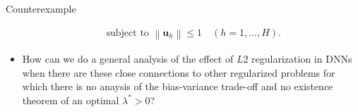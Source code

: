 \documentclass[11pt,compress,t,notes=noshow, xcolor=table]{beamer}
\begin{document}
\begin{vbframe}{Counterexample}
\begin{itemize}
$$\begin{gathered}
\text { subject to }\left\|\boldsymbol{u}_h\right\| \leq 1 \quad(h=1, \ldots, H) .
\end{gathered}
$$
\item How can we do a general analysis of the effect of $L2$ regularization in DNNs when there are these close connections to other regularized problems for which there is no anaysis of the bias-variance trade-off and no existence theorem of an optimal $\lambda^* > 0$?
\end{itemize}
\end{vbframe}


\endlecture
\end{document}
